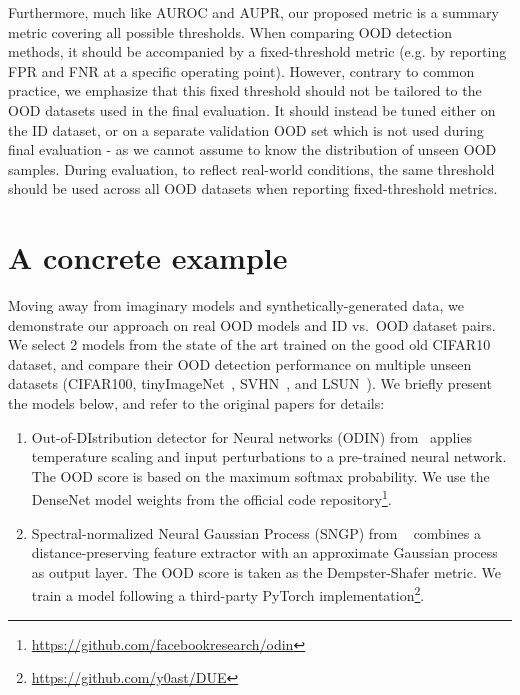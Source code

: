 \documentclass[10pt,twocolumn,letterpaper]{article}
\begin{document}
Furthermore, much like AUROC and AUPR, our proposed metric is a summary metric covering all possible thresholds. When comparing OOD detection methods, it should be accompanied by a fixed-threshold metric (e.g. by reporting FPR and FNR at a specific operating point). However, contrary to common practice, we emphasize that this fixed threshold should not be tailored to the OOD datasets used in the final evaluation. It should instead be tuned either on the ID dataset, or on a separate validation OOD set which is not used during final evaluation - as we cannot assume to know the distribution of unseen OOD samples. During evaluation, to reflect real-world conditions, the same threshold should be used across all OOD datasets when reporting fixed-threshold metrics.




\section{A concrete example}

Moving away from imaginary models and synthetically-generated data, we demonstrate our approach on real OOD models and ID vs.~OOD dataset pairs. We select 2 models from the state of the art trained on the good old CIFAR10~\cite{cifar-dataset-2009} dataset, and compare their OOD detection performance on multiple unseen datasets (CIFAR100, tinyImageNet~\cite{tiny-imagenet-2015}, SVHN~\cite{svhn-dataset-2011}, and LSUN~\cite{lsun-dataset-2015}). We briefly present the models below, and refer to the original papers for details:
\begin{enumerate}[itemsep=0pt]
    \item Out-of-DIstribution detector for Neural networks (ODIN) from~\cite{odin-2018} applies temperature scaling and input perturbations to a pre-trained neural network. The OOD score is based on the maximum softmax probability. We use the DenseNet model weights from the official code repository\footnote{\url{https://github.com/facebookresearch/odin}}.
    \item Spectral-normalized Neural Gaussian Process (SNGP) from ~\cite{sngp-journal-22} combines a distance-preserving feature extractor with an approximate Gaussian process as output layer. The OOD score is taken as the Dempster-Shafer metric. We train a model following a third-party PyTorch implementation\footnote{\url{https://github.com/y0ast/DUE}}.
\end{enumerate}
\end{document}
